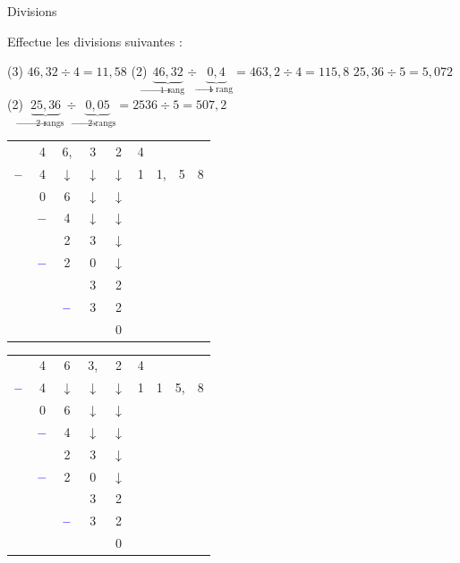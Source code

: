 \documentclass[a4paper,11pt]{report}
\begin{document}
\begin{resolu}{Divisions}
{Effectue les divisions suivantes :
\begin{tasks}(3)
\task $46,32 \div 4 =11,58$
\task*(2) $\underbrace{46,32}_{\rightarrow\mbox{1 rang}} \div \underbrace{0,4}_{\rightarrow\mbox{1 rang}} =463,2 \div 4 = 115,8$
\task $25,36 \div 5 = 5,072$
\task*(2) $\underbrace{25,36}_{\rightarrow\mbox{2 rangs}} \div \underbrace{0,05}_{\rightarrow\mbox{2 rangs}} = 2536 \div 5 = 507,2$
\end{tasks}

\bigskip

\begin{minipage}{0.4\linewidth}
{{{\color{blue}
\begin{tabular}{ccccc|cccc}
&4&6,&3&2  &4 & & &  \\\cline{6-9}
${\color{blue}-}$& 4& $\downarrow$ & $\downarrow$ & $\downarrow$ & 1 & 1, & 5 &8 \\\cline{1-2}
& 0 & 6 &  $\downarrow$ & $\downarrow$  & & &  \\
& ${\color{blue}-}$& 4 & $\downarrow$ & $\downarrow$  & & & \\\cline{2-3}
& & 2 & 3 & $\downarrow$  & & & \\
& ${\color{blue}-}$ & 2 & 0  & $\downarrow$  & & & \\\cline{2-4}
&  & & 3&2  & & & & \\
& & ${\color{blue}-}$ & 3&2  & & & & \\\cline{3-5}
& & &  & 0  & & & &
\end{tabular}
}}}
\end{minipage} \hfill
\begin{minipage}{0.45\linewidth}
{{{\color{blue}
\begin{tabular}{ccccc|cccc}
&4&6&3,&2  &4 & & &  \\\cline{6-9}
${\color{blue}-}$& 4& $\downarrow$ & $\downarrow$ & $\downarrow$  & 1 & 1 & 5, &8 \\\cline{1-2}
& 0 & 6 &  $\downarrow$ & $\downarrow$  & & &  \\
& ${\color{blue}-}$& 4 & $\downarrow$ & $\downarrow$  & & & \\\cline{2-3}
& & 2 & 3 & $\downarrow$  & & & \\
& ${\color{blue}-}$ & 2 & 0  & $\downarrow$  & & & \\\cline{2-4}
&  & & 3&2  & & & & \\
& & ${\color{blue}-}$ & 3&2 & & & & \\\cline{3-5}
& & &  & 0  & & & &
\end{tabular}
}}}
\end{minipage}

}
\end{resolu}
\end{document}
